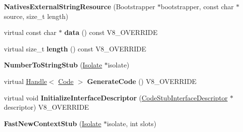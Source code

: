 \begin{DoxyCompactItemize}
\item 
\hypertarget{classv8_1_1internal_1_1_v8___f_i_n_a_l_a59f01a636d669b865dec925ea2ab69c1}{}{\bfseries Natives\+External\+String\+Resource} (Bootstrapper $\ast$bootstrapper, const char $\ast$source, size\+\_\+t length)\label{classv8_1_1internal_1_1_v8___f_i_n_a_l_a59f01a636d669b865dec925ea2ab69c1}

\item 
\hypertarget{classv8_1_1internal_1_1_v8___f_i_n_a_l_a94a63b5623bfeed731b7c3d62e9fffd0}{}virtual const char $\ast$ {\bfseries data} () const V8\+\_\+\+O\+V\+E\+R\+R\+I\+D\+E\label{classv8_1_1internal_1_1_v8___f_i_n_a_l_a94a63b5623bfeed731b7c3d62e9fffd0}

\item 
\hypertarget{classv8_1_1internal_1_1_v8___f_i_n_a_l_adb38594214977498825555a881edde35}{}virtual size\+\_\+t {\bfseries length} () const V8\+\_\+\+O\+V\+E\+R\+R\+I\+D\+E\label{classv8_1_1internal_1_1_v8___f_i_n_a_l_adb38594214977498825555a881edde35}

\item 
\hypertarget{classv8_1_1internal_1_1_v8___f_i_n_a_l_a69182c945c81b6a378a79e663e09ea3b}{}{\bfseries Number\+To\+String\+Stub} (\hyperlink{classv8_1_1internal_1_1_isolate}{Isolate} $\ast$isolate)\label{classv8_1_1internal_1_1_v8___f_i_n_a_l_a69182c945c81b6a378a79e663e09ea3b}

\item 
\hypertarget{classv8_1_1internal_1_1_v8___f_i_n_a_l_a0ed5719f94df27f3b0c610b0a4934a70}{}virtual \hyperlink{classv8_1_1internal_1_1_handle}{Handle}$<$ \hyperlink{classv8_1_1internal_1_1_code}{Code} $>$ {\bfseries Generate\+Code} () V8\+\_\+\+O\+V\+E\+R\+R\+I\+D\+E\label{classv8_1_1internal_1_1_v8___f_i_n_a_l_a0ed5719f94df27f3b0c610b0a4934a70}

\item 
\hypertarget{classv8_1_1internal_1_1_v8___f_i_n_a_l_aedb89fb967acc9802a2789257d456f13}{}virtual void {\bfseries Initialize\+Interface\+Descriptor} (\hyperlink{classv8_1_1internal_1_1_code_stub_interface_descriptor}{Code\+Stub\+Interface\+Descriptor} $\ast$descriptor) V8\+\_\+\+O\+V\+E\+R\+R\+I\+D\+E\label{classv8_1_1internal_1_1_v8___f_i_n_a_l_aedb89fb967acc9802a2789257d456f13}

\item 
\hypertarget{classv8_1_1internal_1_1_v8___f_i_n_a_l_a871bc84cec7991b15d608c3e34b845cc}{}{\bfseries Fast\+New\+Context\+Stub} (\hyperlink{classv8_1_1internal_1_1_isolate}{Isolate} $\ast$isolate, int slots)\label{classv8_1_1internal_1_1_v8___f_i_n_a_l_a871bc84cec7991b15d608c3e34b845cc}


\end{DoxyCompactItemize}
